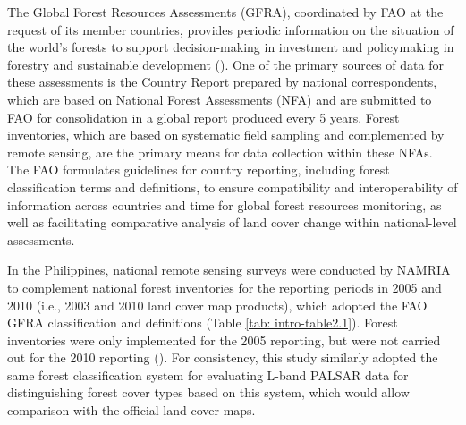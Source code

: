 The Global Forest Resources Assessments (GFRA), coordinated by FAO at the request of its member countries, provides periodic information on the situation of the world's forests to support decision-making in investment and policymaking in forestry and sustainable development (\cite{fao_global_2015}). One of the primary sources of data for these assessments is the Country Report prepared by national correspondents, which are based on National Forest Assessments (NFA) and are submitted to FAO for consolidation in a global report produced every 5 years. Forest inventories, which are based on systematic field sampling and complemented by remote sensing, are the primary means for data collection within these NFAs. The FAO formulates guidelines for country reporting, including forest classification terms and definitions, to ensure compatibility and interoperability of information across countries and time for global forest resources monitoring, as well as facilitating comparative analysis of land cover change within national-level assessments.

In the Philippines, national remote sensing surveys were conducted by NAMRIA to complement national forest inventories for the reporting periods in 2005 and 2010 (i.e., 2003 and 2010 land cover map products), which adopted the FAO GFRA classification and definitions (Table \ref{tab: intro-table2.1}). Forest inventories were only implemented for the 2005 reporting, but were not carried out for the 2010 reporting (\cite{fao_2010_2010}). For consistency, this study similarly adopted the same forest classification system for evaluating L-band PALSAR data for distinguishing forest cover types based on this system, which would allow comparison with the official land cover maps.\\

